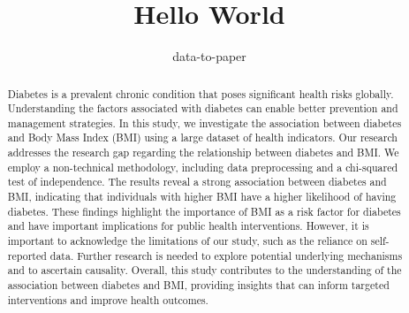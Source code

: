 \documentclass[12pt]{article}
\title{Hello World}
\author{data-to-paper}
\begin{document}
\maketitle

\begin{abstract}
Diabetes is a prevalent chronic condition that poses significant health risks globally. Understanding the factors associated with diabetes can enable better prevention and management strategies. In this study, we investigate the association between diabetes and Body Mass Index (BMI) using a large dataset of health indicators. Our research addresses the research gap regarding the relationship between diabetes and BMI. We employ a non-technical methodology, including data preprocessing and a chi-squared test of independence. The results reveal a strong association between diabetes and BMI, indicating that individuals with higher BMI have a higher likelihood of having diabetes. These findings highlight the importance of BMI as a risk factor for diabetes and have important implications for public health interventions. However, it is important to acknowledge the limitations of our study, such as the reliance on self-reported data. Further research is needed to explore potential underlying mechanisms and to ascertain causality. Overall, this study contributes to the understanding of the association between diabetes and BMI, providing insights that can inform targeted interventions and improve health outcomes.
\end{abstract}
\end{document}
